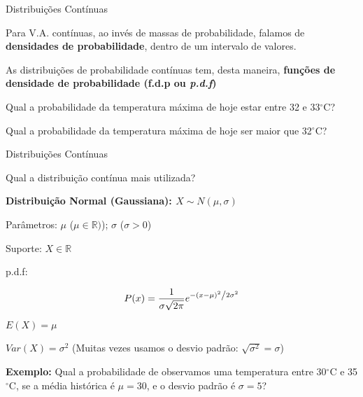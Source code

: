 \documentclass{beamer}
\begin{document}
\begin{frame}{Distribuições Contínuas}


Para V.A. contínuas, ao invés de massas de probabilidade, falamos de \textbf{densidades de probabilidade}, dentro de um intervalo de valores.

\vfill

As distribuições de probabilidade contínuas tem, desta maneira, \textbf{funções de densidade de probabilidade (f.d.p ou \emph{p.d.f})}

\vfill

Qual a probabilidade da temperatura máxima de hoje estar entre 32 e 33$^\circ$C?

Qual a probabilidade da temperatura máxima de hoje ser maior que 32$^\circ$C?
    
\end{frame} 

\begin{frame}{Distribuições Contínuas}

Qual a distribuição contínua mais utilizada? \pause

\vfill

\textbf{Distribuição Normal (Gaussiana): $X \sim N(\mu,\sigma)$}

\begin{footnotesize}

Parâmetros: $\mu$ ($\mu \in \mathbb{R})$); $\sigma$ ($\sigma > 0$)

Suporte: $X \in \mathbb{R}$

p.d.f:

\begin{equation*}
P(x) = \frac{1}{{\sigma \sqrt {2\pi } }}e^{{{ - \left( {x - \mu } \right)^2 } \mathord{\left/ {\vphantom {{ - \left( {x - \mu } \right)^2 } {2\sigma ^2 }}} \right. \kern-\nulldelimiterspace} {2\sigma ^2 }}}
\end{equation*}

$E(X) = \mu$

$Var(X) = \sigma^2$ (Muitas vezes usamos o desvio padrão: $\sqrt{\sigma^2} = \sigma$)



\alert{\textbf{Exemplo:}} Qual a probabilidade de observamos uma temperatura entre 30$^\circ$C e 35$^\circ$C, se a média histórica é $\mu = 30$, e o desvio padrão é $\sigma = 5$?

\end{footnotesize}
    
\end{frame} 
\end{document}
